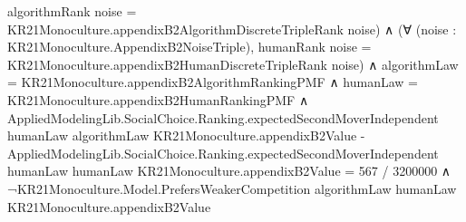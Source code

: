 \documentclass[10pt]{article}
\begin{document}
\begin{ReviewVerbatim}
                  algorithmRank noise = KR21Monoculture.appendixB2AlgorithmDiscreteTripleRank noise) ∧
                (∀ (noise : KR21Monoculture.AppendixB2NoiseTriple),
                    humanRank noise = KR21Monoculture.appendixB2HumanDiscreteTripleRank noise) ∧
                  algorithmLaw = KR21Monoculture.appendixB2AlgorithmRankingPMF ∧
                    humanLaw = KR21Monoculture.appendixB2HumanRankingPMF ∧
                      AppliedModelingLib.SocialChoice.Ranking.expectedSecondMoverIndependent humanLaw algorithmLaw
                              KR21Monoculture.appendixB2Value -
                            AppliedModelingLib.SocialChoice.Ranking.expectedSecondMoverIndependent humanLaw humanLaw
                              KR21Monoculture.appendixB2Value =
                          567 / 3200000 ∧
                        ¬KR21Monoculture.Model.PrefersWeakerCompetition algorithmLaw humanLaw
                            KR21Monoculture.appendixB2Value
\end{ReviewVerbatim}
\end{document}
